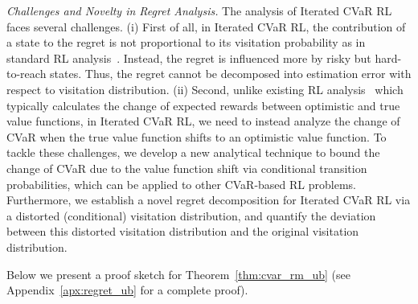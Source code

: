 \documentclass{article} %
\newcommand{\revision}[1]{{\color{black} #1}}
\newcommand{\longbo}[1]{}
\newcommand{\longbo}[1]{{\color{red}  [\text{Longbo:} #1]}}
\begin{document}
	
	
	
	
	\revision{\emph{Challenges and Novelty in Regret Analysis.} 
		The analysis of Iterated CVaR RL faces several challenges.
		(i) First of all, in Iterated CVaR RL, the contribution of a state to the regret is not proportional to its visitation probability as in standard RL analysis~\citep{jaksch2010near,azar2017minimax,zanette2019tighter}. Instead, the regret is influenced more by risky but hard-to-reach states. Thus, the regret cannot be decomposed into estimation error with respect to visitation distribution. (ii) Second, unlike existing RL analysis~\citep{jaksch2010near,azar2017minimax,jin2018q} which typically calculates the change of expected rewards between optimistic and true value functions, in Iterated CVaR RL, we need to instead analyze the change of CVaR when the true value function shifts to an optimistic value function.
		To tackle these challenges,  
		we develop a new analytical technique to bound the change of CVaR due to the value function shift via conditional transition probabilities, which can be applied to other CVaR-based RL problems. Furthermore, we establish a novel regret decomposition for Iterated CVaR RL via a distorted (conditional) visitation distribution, and quantify the deviation between this distorted visitation distribution and the original visitation distribution.}
	
	
	Below we present a proof sketch for Theorem~\ref{thm:cvar_rm_ub} (see Appendix~\ref{apx:regret_ub} for a complete proof). 
	
\end{document}
